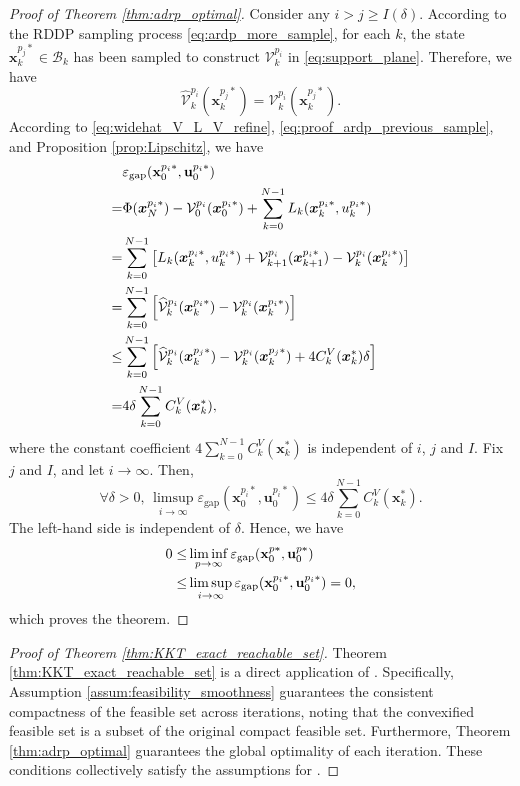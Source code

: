 \documentclass[journal]{IEEEtran}
\theoremstyle{definition}
\theoremstyle{definition}
\renewcommand\vector[1]{\boldsymbol{#1}}
\newcommand\vx{{\vector{x}}}
\newcommand\bx{{\mathbf{x}}}
\newcommand\bu{{\mathbf{u}}}
\begin{document}
\begin{proof}[Proof of Theorem \ref{thm:adrp_optimal}]
    Consider any $i>j\geq I(\delta)$. According to the RDDP sampling process \eqref{eq:ardp_more_sample}, for each $k$, the state $\vx_k^{p_j*}\in\mathcal{B}_k$ has been sampled to construct $\mathcal{V}_k^{p_i}$ in \eqref{eq:support_plane}. Therefore, we have 
    \begin{equation}\label{eq:proof_ardp_previous_sample}
        \widehat{\mathcal{V}}_k^{p_i}(\vx_k^{p_j*})=\mathcal{V}_k^{p_i}(\vx_k^{p_j*}).
    \end{equation}
    According to \eqref{eq:widehat_V_L_V_refine}, \eqref{eq:proof_ardp_previous_sample}, and Proposition \ref{prop:Lipschitz}, we have
    \begin{align}
        &\varepsilon_\text{gap}(\bx_0^{p_i*},\bu_0^{p_i*})\notag\\
        =&\Phi(\vx_N^{p_i*}) - \mathcal{V}_0^{p_i}(\vx_0^{p_i*})+\sum_{k=0}^{N-1} L_k(\vx_k^{p_i*}, u_k^{p_i*})\notag\\
        =&\sum_{k=0}^{N-1}\left[L_k(\vx_k^{p_i*}, u_k^{p_i*})+\mathcal{V}_{k+1}^{p_i}(\vx_{k+1}^{p_i*})-\mathcal{V}_k^{p_i}(\vx_k^{p_i*})\right]\notag\\
        =&\sum_{k=0}^{N-1}\left[\widehat{\mathcal{V}}_k^{p_i}(\vx_k^{p_i*})-\mathcal{V}_k^{p_i}(\vx_k^{p_i*})\right]\notag\\
        \leq&\sum_{k=0}^{N-1}\left[\widehat{\mathcal{V}}_k^{p_i}(\vx_k^{p_j*})-\mathcal{V}_k^{p_i}(\vx_k^{p_j*})+4C_k^V(\vx_k^*)\delta\right]\notag\\
        =&4\delta\sum_{k=0}^{N-1}C_k^V(\vx_k^*),
    \end{align}
    where the constant coefficient $4\sum_{k=0}^{N-1}C_k^V(\vx_k^*)$ is independent of $i$, $j$ and $I$. Fix $j$ and $I$, and let $i\to\infty$. Then,
    \begin{equation}
        \forall \delta>0,\,\limsup_{i\to\infty} \varepsilon_\text{gap}(\bx_0^{p_i*},\bu_0^{p_i*}) \leq 4\delta\sum_{k=0}^{N-1}C_k^V(\vx_k^*).
    \end{equation}
    The left-hand side is independent of $\delta$. Hence, we have
    \begin{align}
        0\leq&\liminf_{p\to\infty} \varepsilon_\text{gap}(\bx_0^{p*},\bu_0^{p*})\notag\\
        \leq&\limsup_{i\to\infty} \varepsilon_\text{gap}(\bx_0^{p_i*},\bu_0^{p_i*})=0,
    \end{align}
    which proves the theorem.
\end{proof}

\begin{proof}[Proof of Theorem \ref{thm:KKT_exact_reachable_set}]
    Theorem \ref{thm:KKT_exact_reachable_set} is a direct application of \cite[Theorem 10]{sriperumbudur2009convergence}. Specifically, Assumption \ref{assum:feasibility_smoothness} guarantees the consistent compactness of the feasible set across iterations, noting that the convexified feasible set is a subset of the original compact feasible set. Furthermore, Theorem \ref{thm:adrp_optimal} guarantees the global optimality of each iteration. These conditions collectively satisfy the assumptions for \cite[Theorem 10]{sriperumbudur2009convergence}.
\end{proof}
\end{document}
